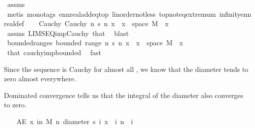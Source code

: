 \begin{isabellebody}
\ assms{\isacharparenleft}{\kern0pt}{}{\isacharparenright}{\kern0pt}\ \isamarkupfalse%
\ {\isacharparenleft}{\kern0pt}metis\ {\isacharparenleft}{\kern0pt}mono{\isacharunderscore}{\kern0pt}tags{\isacharparenright}{\kern0pt}\ ennreal{\isacharunderscore}{\kern0pt}add{\isacharunderscore}{\kern0pt}eq{\isacharunderscore}{\kern0pt}top\ linorder{\isacharunderscore}{\kern0pt}not{\isacharunderscore}{\kern0pt}less\ top{\isachardot}{\kern0pt}not{\isacharunderscore}{\kern0pt}eq{\isacharunderscore}{\kern0pt}extremum\ infinity{\isacharunderscore}{\kern0pt}ennreal{\isacharunderscore}{\kern0pt}def{\isacharparenright}{\kern0pt}\isanewline
\isanewline
\ \ \isamarkupfalse%
\ Cauchy{\isacharcolon}{\kern0pt}\ {\isachardoublequoteopen}Cauchy\ {\isacharparenleft}{\kern0pt}{\isasymlambda}n{\isachardot}{\kern0pt}\ s\ n\ x{\isacharparenright}{\kern0pt}{\isachardoublequoteclose}\ \ {\isachardoublequoteopen}x\ {\isasymin}\ space\ M{\isachardoublequoteclose}\ \ x\ \isamarkupfalse%
\ assms{\isacharparenleft}{\kern0pt}{}{\isacharparenright}{\kern0pt}\ LIMSEQ{\isacharunderscore}{\kern0pt}imp{\isacharunderscore}{\kern0pt}Cauchy\ that\ \isamarkupfalse%
\ blast\isanewline
\ \ \isamarkupfalse%
\ bounded{\isacharunderscore}{\kern0pt}range{\isacharunderscore}{\kern0pt}s{\isacharcolon}{\kern0pt}\ {\isachardoublequoteopen}bounded\ {\isacharparenleft}{\kern0pt}range\ {\isacharparenleft}{\kern0pt}{\isasymlambda}n{\isachardot}{\kern0pt}\ s\ n\ x{\isacharparenright}{\kern0pt}{\isacharparenright}{\kern0pt}{\isachardoublequoteclose}\ \ {\isachardoublequoteopen}x\ {\isasymin}\ space\ M{\isachardoublequoteclose}\ \ x\ \isamarkupfalse%
\ that\ cauchy{\isacharunderscore}{\kern0pt}imp{\isacharunderscore}{\kern0pt}bounded\ \isamarkupfalse%
\ fast%
\begin{isamarkuptext}%
Since the sequence  is Cauchy for almost all , we know that the diameter tends to zero almost everywhere.%
\end{isamarkuptext}\isamarkuptrue%
%
\begin{isamarkuptext}%
Dominated convergence tells us that the integral of the diameter also converges to zero.%
\end{isamarkuptext}\isamarkuptrue%
\ \ \isamarkupfalse%
\ {\isachardoublequoteopen}AE\ x\ in\ M{\isachardot}{\kern0pt}\ {\isacharparenleft}{\kern0pt}{\isasymlambda}n{\isachardot}{\kern0pt}\ diameter\ {\isacharbraceleft}{\kern0pt}s\ i\ x\ {\isacharbar}{\kern0pt}\ i{\isachardot}{\kern0pt}\ n\ {\isasymle}\ i{\isacharbraceright}{\kern0pt}{\isacharparenright}{\kern0pt}\ {\isasymlonglonglongrightarrow}\ {}{\isachardoublequoteclose}\ \isamarkupfalse%

\end{isabellebody}
